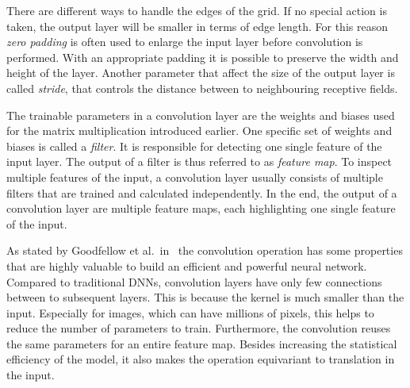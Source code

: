 There are different ways to handle the edges of the grid. If no special action is taken, the output layer will be smaller in terms of edge length. For this reason \emph{zero padding} is often used to enlarge the input layer before convolution is performed. With an appropriate padding it is possible to preserve the width and height of the layer. Another parameter that affect the size of the output layer is called \emph{stride}, that controls the distance between to neighbouring receptive fields.~\cite[p.~361]{praxiseinstieg_ml17}

The trainable parameters in a convolution layer are the weights and biases used for the matrix multiplication introduced earlier. One specific set of weights and biases is called a \emph{filter}. It is responsible for detecting one single feature of the input layer. The output of a filter is thus referred to as \emph{feature map}. To inspect multiple features of the input, a convolution layer usually consists of multiple filters that are trained and calculated independently. In the end, the output of a convolution layer are multiple feature maps, each highlighting one single feature of the input.~\cite[p.~363 f]{praxiseinstieg_ml17}

As stated by Goodfellow et al.\ in~\cite{DLbook16} the convolution operation has some properties that are highly valuable to build an efficient and powerful neural network. Compared to traditional DNNs, convolution layers have only few connections between to subsequent layers. This is because the kernel is much smaller than the input. Especially for images, which can have millions of pixels, this helps to reduce the number of parameters to train. Furthermore, the convolution reuses the same parameters for an entire feature map. Besides increasing the statistical efficiency of the model, it also makes the operation equivariant to translation in the input.


